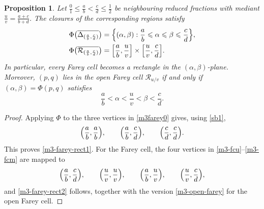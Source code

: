 \documentclass[11pt,reqno,tbtags,a4paper]{amsart}
\numberwithin{equation}{section}
\renewcommand\le{\leq}
\renewcommand\leq{\leqslant}
\theoremstyle{plain}%
\newtheorem{proposition}[theorem]{Proposition}
\theoremstyle{definition}
\theoremstyle{remark}
\newcommand\ga{\alpha}
\newcommand\gb{\beta}
\newcommand\cR{{\mathcal R}}
\newcommand\0{{\boldsymbol 0}}
\newcommand\1{{\boldsymbol 1}}
\begin{document}
\begin{proposition}\label{Pm3-farey-rect}
Let $\frac 01\le\frac ab<\frac cd\le\frac12$ 
be neighbouring reduced fractions with mediant
$\frac uv=\frac{a+c}{b+d}$. The closures of the corresponding regions satisfy
\begin{align}
\Phi\bigl(\overline{\Delta_{(\frac ab,\frac cd)}}\bigr)
&=
\Bigl\{(\alpha,\beta):\frac ab\le \alpha\le \beta\le \frac cd\Bigr\},
\label{m3-farey-rect1}
\\
\Phi\bigl(\overline{\cR_{(\frac ab,\frac cd)}}\bigr)
&=
\Bigl[\frac ab,\frac uv\Bigr]\times\Bigl[\frac uv,\frac cd\Bigr].
\label{m3-farey-rect2}
\end{align}
In particular, every Farey cell becomes a rectangle in the
$(\alpha,\beta)$-plane. 
Moreover, $(p,q)$ lies in the open Farey cell
$\cR_{u/v}$ if and only if $(\ga,\gb)=\Phi(p,q)$ satisfies
\begin{equation}\label{m3-open-farey}
        \frac ab<\alpha<\frac uv<\beta<\frac cd .
\end{equation}
\end{proposition}

\begin{proof}
Applying $\Phi$ to the three vertices in \eqref{m3farey0} gives,
using \eqref{sb1},
\begin{align}
\Bigl(\frac ab,\frac ab\Bigr),\qquad
\Bigl(\frac ab,\frac cd\Bigr),\qquad
\Bigl(\frac cd,\frac cd\Bigr).
\end{align}
%
%
%
%
%
This proves \eqref{m3-farey-rect1}.
For the Farey cell, the four vertices in 
\eqref{m3-fcu}--\eqref{m3-fcm} 
are mapped to
\begin{align}
\Bigl(\frac ab,\frac cd\Bigr),\qquad
\Bigl(\frac uv,\frac uv\Bigr),\qquad
\Bigl(\frac ab,\frac uv\Bigr),\qquad
\Bigl(\frac uv,\frac cd\Bigr),
\end{align}
and \eqref{m3-farey-rect2} follows, together with the version
\eqref{m3-open-farey} for the open Farey cell.
\end{proof}
\end{document}
